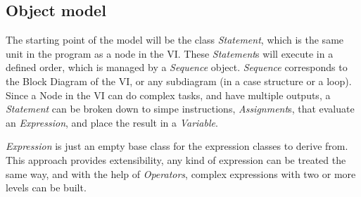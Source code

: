 \subsection{Object model}

The starting point of the model will be the class \textit{Statement}, which is the same unit in the program as a node in the VI. These \textit{Statement}s will execute in a defined order, which is managed by a \textit{Sequence} object. \textit{Sequence} corresponds to the Block Diagram of the VI, or any subdiagram (in a case structure or a loop). Since a Node in the VI can do complex tasks, and have multiple outputs, a \textit{Statement} can be broken down to simpe instructions, \textit{Assignment}s, that evaluate an \textit{Expression}, and place the result in a \textit{Variable}.

\textit{Expression} is just an empty base class for the expression classes to derive from. This approach provides extensibility, any kind of expression can be treated the same way, and with the help of \textit{Operators}, complex expressions with two or more levels can be built.

